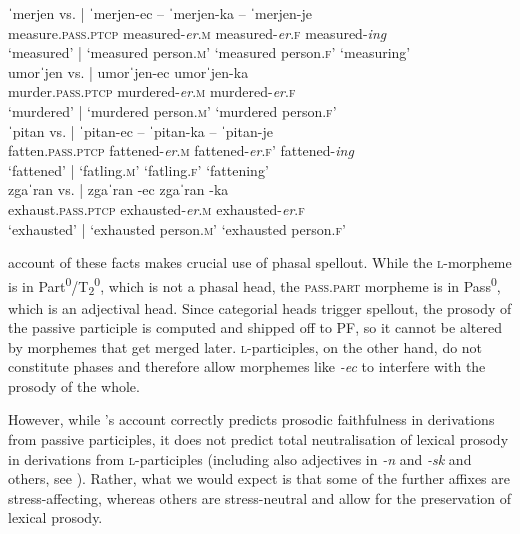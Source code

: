 \documentclass[output=paper,colorlinks,citecolor=brown]{langscibook}
\begin{document}
\ea \label{ex:pros2}
\ea
\glll ˈmerjen vs. | ˈmerjen-ec -- ˈmerjen-ka -- ˈmerjen-je\\
measure.\textsc{pass.ptcp} {} {} measured-\textit{er}.\textsc{m} {} measured-\textit{er}.\textsc{f} {} measured-\textit{ing}\\
`measured' {} | `measured{ }person.\textsc{m}' {} `measured{ }person.\textsc{f}' {} `measuring'\\
\ex
\glll umorˈjen vs. | umorˈjen-ec {} umorˈjen-ka\\
murder.\textsc{pass.ptcp} {} {} murdered-\textit{er}.\textsc{m}  {} murdered-\textit{er}.\textsc{f} \\
`murdered' {} | `murdered{ }person.\textsc{m}' {} `murdered{ }person.\textsc{f}' \\
\ex
\glll ˈpitan vs. | ˈpitan-ec -- ˈpitan-ka --  ˈpitan-je \\
fatten.\textsc{pass.ptcp} {} {} fattened-\textit{er}.\textsc{m} {} fattened-\textit{er}.\textsc{f}' {} fattened-\textit{ing}\\
`fattened' {} | `fatling.\textsc{m}' {} `fatling.\textsc{f}' {} `fattening'\\
\ex
\glll zgaˈran vs. | zgaˈran{ }-ec {} zgaˈran{ }-ka\\
exhaust.\textsc{pass.ptcp} {} {} exhausted-\textit{er}.\textsc{m} {} exhausted-\textit{er}.\textsc{f}\\
`exhausted' {} | `exhausted{ }person.\textsc{m}' {} `exhausted{ }person.\textsc{f}'\\
\z 
\z 


\noindent {} account of these facts makes crucial use of phasal spellout. While the \textsc{l}-morpheme is in Part\textsuperscript{0}/T\textsubscript{2}\textsuperscript{0}, which is not a phasal head, the \textsc{pass.part} morpheme is in Pass\textsuperscript{0}, which is an adjectival head. Since categorial heads trigger spellout, the prosody of the passive participle is computed and shipped off to PF, so it cannot be altered by morphemes that get merged later. \textsc{l}-participles, on the other hand, do not constitute phases and therefore allow morphemes like \textit{-ec} to interfere with the prosody of the whole. 

However, while \citeauthor{marvin2002}'s account correctly predicts prosodic faithfulness in derivations from passive participles, it does not predict total neutralisation of lexical prosody in derivations from \textsc{l}-participles (including also adjectives in \textit{-n} and \textit{-sk} and others, see \citealt{Simonovic2020}). Rather, what we would expect is that some of the further affixes are stress-affecting, whereas others are stress-neutral and allow for the preservation of lexical prosody. 
\end{document}
